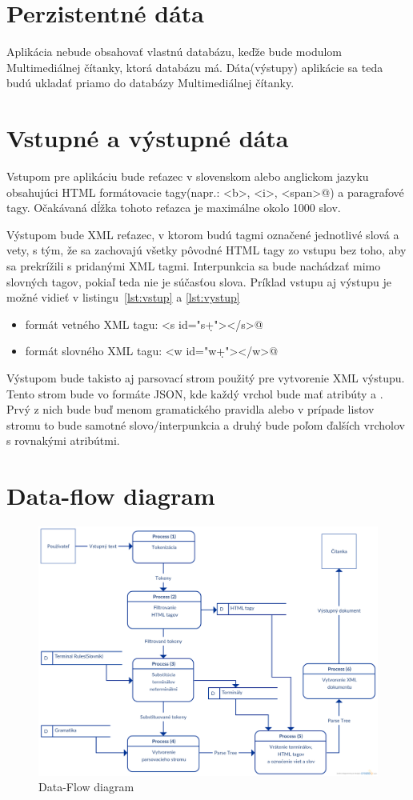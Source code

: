 \documentclass[12pt,a4paper]{report}
\theoremstyle{definition}
\theoremstyle{remark}
\begin{document}
\section{Perzistentné dáta}
Aplikácia nebude obsahovať vlastnú databázu, keďže bude modulom Multimediálnej čítanky, ktorá databázu má. Dáta(výstupy) aplikácie sa teda budú ukladať priamo do databázy Multimediálnej čítanky.

\section{Vstupné a výstupné dáta}
Vstupom pre aplikáciu bude reťazec v slovenskom alebo anglickom jazyku obsahujúci HTML formátovacie tagy(napr.: \verb@<b>, <i>, <span>@) a paragrafové tagy. Očakávaná dĺžka tohoto reťazca je maximálne okolo 1000 slov.

Výstupom bude XML reťazec, v ktorom budú tagmi označené jednotlivé slová a vety, s tým, že sa zachovajú všetky pôvodné HTML tagy zo vstupu bez toho, aby sa prekrížili s pridanými XML tagmi. Interpunkcia sa bude nachádzať mimo slovných tagov, pokiaľ teda nie je súčasťou slova. Príklad vstupu aj výstupu je možné vidieť v listingu~\ref{lst:vstup} a \ref{lst:vystup}
\begin{itemize}
\item formát vetného XML tagu: \verb@<s id="s\d+"></s>@
\item formát slovného XML tagu: \verb@<w id="w\d+"></w>@
\end{itemize}

Výstupom bude takisto aj parsovací strom použitý pre vytvorenie XML výstupu. Tento strom bude vo formáte JSON, kde každý vrchol bude mať atribúty \verb@name@ a \verb@children@. Prvý z nich bude buď menom gramatického pravidla alebo v prípade listov stromu to bude samotné slovo/interpunkcia a druhý bude poľom ďalších vrcholov s rovnakými atribútmi.

\section{Data-flow diagram}
\begin{figure}[h]
\centering
\includegraphics[scale=0.2]{DFD}
\caption{Data-Flow diagram}
\end{figure}
\end{document}

